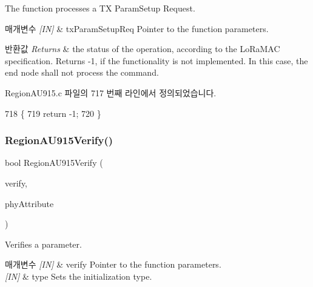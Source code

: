 The function processes a TX Param\+Setup Request. 


\begin{DoxyParams}{매개변수}
{\em \mbox{[}\+I\+N\mbox{]}} & tx\+Param\+Setup\+Req Pointer to the function parameters.\\
\hline
\end{DoxyParams}

\begin{DoxyRetVals}{반환값}
{\em Returns} & the status of the operation, according to the Lo\+Ra\+M\+AC specification. Returns -\/1, if the functionality is not implemented. In this case, the end node shall not process the command. \\
\hline
\end{DoxyRetVals}


Region\+A\+U915.\+c 파일의 717 번째 라인에서 정의되었습니다.


\begin{DoxyCode}
718 \{
719     \textcolor{keywordflow}{return} -1;
720 \}
\end{DoxyCode}
\mbox{\label{group___r_e_g_i_o_n_a_u915_ga728e3b1cdcd99b88a8c923c9fd0fd9a4}} 
\subsubsection{\texorpdfstring{Region\+A\+U915\+Verify()}{RegionAU915Verify()}}
{\footnotesize\ttfamily bool Region\+A\+U915\+Verify (\begin{DoxyParamCaption}\item[{\mbox{\hyperlink{group___r_e_g_i_o_n_ga966d97bc2f25df1c09e92e60ef652276}{Verify\+Params\+\_\+t}} $\ast$}]{verify,  }\item[{\mbox{\hyperlink{group___r_e_g_i_o_n_ga9445b07fdf77581ecfaf389970e635f8}{Phy\+Attribute\+\_\+t}}}]{phy\+Attribute }\end{DoxyParamCaption})}



Verifies a parameter. 


\begin{DoxyParams}{매개변수}
{\em \mbox{[}\+I\+N\mbox{]}} & verify Pointer to the function parameters.\\
\hline
{\em \mbox{[}\+I\+N\mbox{]}} & type Sets the initialization type.\\
\hline
\end{DoxyParams}

